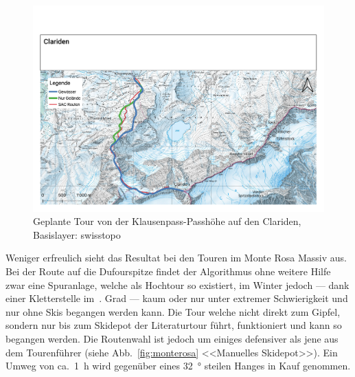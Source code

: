 \begin{figure}[ht]
  \centering
  \includegraphics[page=1,width=.9\linewidth]{./../evaluation/PDFs/Clariden.pdf}
  \caption{Geplante Tour von der Klausenpass-Passhöhe auf den Clariden, \\Basislayer: swisstopo}\label{fig:clariden}
\end{figure}


Weniger erfreulich sieht das Resultat bei den Touren im Monte Rosa Massiv aus. Bei der Route auf die Dufourspitze findet der Algorithmus ohne weitere Hilfe zwar eine Spuranlage, welche als Hochtour so existiert, im Winter jedoch --- dank einer Kletterstelle im~. Grad --- kaum oder nur unter extremer Schwierigkeit und nur ohne Skis begangen werden kann. 
Die Tour welche nicht direkt zum Gipfel, sondern nur bis zum Skidepot der Literaturtour führt, funktioniert und kann so begangen werden. Die Routenwahl ist jedoch um einiges defensiver als jene aus dem Tourenführer (siehe Abb.\ \ref{fig:monterosa} <<Manuelles Skidepot>>). Ein Umweg von ca.\ \qty{1}{h} wird gegenüber eines \qty{32}{°} steilen Hanges in Kauf genommen.

